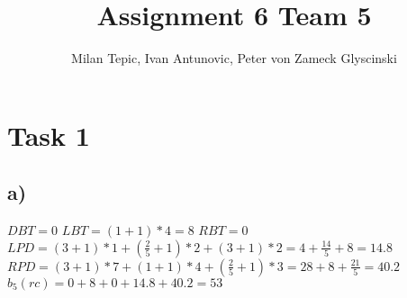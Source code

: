 \documentclass[10pt,a4paper]{article}
\author{Milan Tepic, Ivan Antunovic, Peter von Zameck Glyscinski}
\title{Assignment 6 Team 5}
\begin{document}
\maketitle
\section*{Task 1}
\subsection*{a)}
$DBT = 0$
\newline
$LBT = (1+1) * 4 = 8$
\newline
$RBT = 0$
\newline
$LPD = (3 + 1) * 1 + (\frac{2}{5} + 1) * 2 + (3 + 1) * 2 = 4 + \frac{14}{5} + 8 = 14.8$
\newline
$RPD = (3 + 1) * 7 + (1 + 1) * 4 + (\frac{2}{5} + 1) * 3 = 28 + 8 + \frac{21}{5} = 40.2$
\newline
$b_5(rc) = 0 + 8 + 0 + 14.8 + 40.2 = 53$
\end{document}
